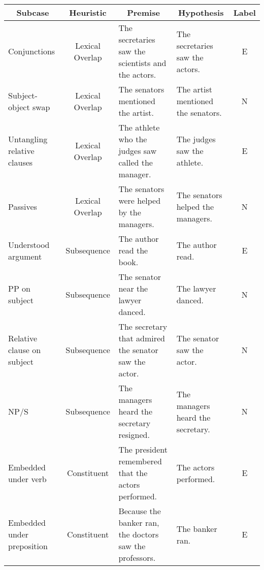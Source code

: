 \documentclass[11pt]{article}
\begin{document}
\begin{table}[]
\centering
\begin{adjustbox}{width=1.1\textwidth}
\hspace*{-1.0cm}\begin{tabular}{@{}lcllc@{}}
\toprule
\multicolumn{1}{c}{\textbf{Subcase}} & \textbf{Heuristic} & \multicolumn{1}{c}{\textbf{Premise}}                       & \multicolumn{1}{c}{\textbf{Hypothesis}} & \textbf{Label} \\ \midrule
Conjunctions                         & Lexical Overlap    & The secretaries saw the scientists and the actors.         & The secretaries saw the actors.         & E              \\
Subject-object swap                  & Lexical Overlap    & The senators mentioned the artist.                         & The artist mentioned the senators.      & N              \\
Untangling relative clauses          & Lexical Overlap    & The athlete who the judges saw called the manager.         & The judges saw the athlete.             & E              \\
Passives                             & Lexical Overlap    & The senators were helped by the managers.                  & The senators helped the managers.       & N              \\
Understood argument                  & Subsequence        & The author read the book.                                  & The author read.                        & E              \\
PP on subject                        & Subsequence        & The senator near the lawyer danced.                        & The lawyer danced.                      & N              \\
Relative clause on subject           & Subsequence        & The secretary that admired the senator saw the actor.      & The senator saw the actor.              & N              \\
NP/S                                 & Subsequence        & The managers heard the secretary resigned.                 & The managers heard the secretary.       & N              \\
Embedded under verb                  & Constituent        & The president remembered that the actors performed.        & The actors performed.                   & E              \\
Embedded under preposition           & Constituent        & Because the banker ran, the doctors saw the professors.    & The banker ran.                         & E              \\

\end{tabular}
\end{adjustbox}
\end{table}
\end{document}
